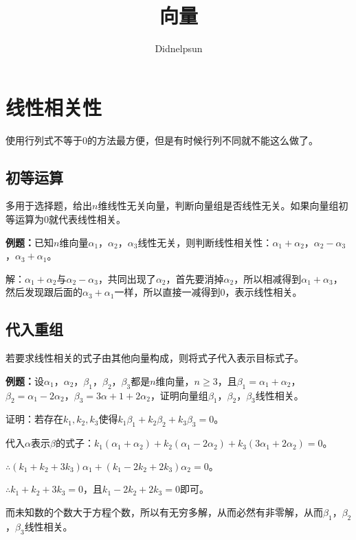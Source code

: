 \documentclass[UTF8, 12pt]{ctexart}
\author{Didnelpsun}
\title{向量}
\date{}
\begin{document}
\maketitle
\pagestyle{empty}
\thispagestyle{empty}
\tableofcontents
\thispagestyle{empty}
\newpage
\pagestyle{plain}
\setcounter{page}{1}

\section{线性相关性}

使用行列式不等于$0$的方法最方便，但是有时候行列不同就不能这么做了。

\subsection{初等运算}

多用于选择题，给出$n$维线性无关向量，判断向量组是否线性无关。如果向量组初等运算为0就代表线性相关。

\textbf{例题：}已知$n$维向量$\alpha_1$，$\alpha_2$，$\alpha_3$线性无关，则判断线性相关性：$\alpha_1+\alpha_2$，$\alpha_2-\alpha_3$，$\alpha_3+\alpha_1$。

解：$\alpha_1+\alpha_2$与$\alpha_2-\alpha_3$，共同出现了$\alpha_2$，首先要消掉$\alpha_2$，所以相减得到$\alpha_1+\alpha_3$，然后发现跟后面的$\alpha_3+\alpha_1$一样，所以直接一减得到0，表示线性相关。

\subsection{代入重组}

若要求线性相关的式子由其他向量构成，则将式子代入表示目标式子。

\textbf{例题：}设$\alpha_1$，$\alpha_2$，$\beta_1$，$\beta_2$，$\beta_3$都是$n$维向量，$n\geqslant3$，且$\beta_1=\alpha_1+\alpha_2$，$\beta_2=\alpha_1-2\alpha_2$，$\beta_3=3\alpha+1+2\alpha_2$，证明向量组$\beta_1$，$\beta_2$，$\beta_3$线性相关。

证明：若存在$k_1,k_2,k_3$使得$k_1\beta_1+k_2\beta_2+k_3\beta_3=0$。

代入$\alpha$表示$\beta$的式子：$k_1(\alpha_1+\alpha_2)+k_2(\alpha_1-2\alpha_2)+k_3(3\alpha_1+2\alpha_2)=0$。

$\therefore(k_1+k_2+3k_3)\alpha_1+(k_1-2k_2+2k_3)\alpha_2=0$。

$\therefore k_1+k_2+3k_3=0$，且$k_1-2k_2+2k_3=0$即可。

而未知数的个数大于方程个数，所以有无穷多解，从而必然有非零解，从而$\beta_1$，$\beta_2$，$\beta_3$线性相关。
\end{document}
